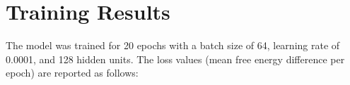 \documentclass{article}
\begin{document}
\section{Training Results}
The model was trained for 20 epochs with a batch size of 64, learning rate of 0.0001, and 128 hidden units. The loss values (mean free energy difference per epoch) are reported as follows:

\end{document}
